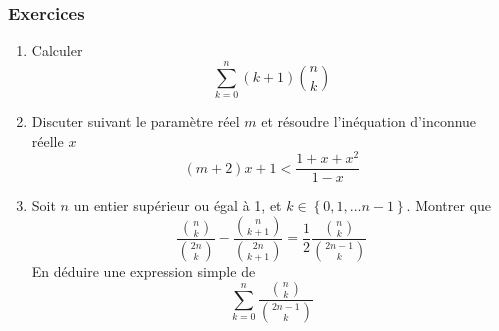 \subsubsection*{Exercices}
\begin{enumerate}
  \item Calculer
\begin{displaymath}
 \sum_{k=0}^n (k+1)\binom{n}{k}
\end{displaymath}

  \item Discuter suivant le param{\`e}tre réel $m$ et r{\'e}soudre l'in{\'e}quation d'inconnue réelle $x$
\begin{displaymath}
 (m+2)x+1<\frac{1+x+x^2}{1-x}
\end{displaymath}

  \item Soit $n$ un entier sup{\'e}rieur ou {\'e}gal {\`a} 1, et $k\in\left\lbrace0,1,\dots n-1 \right\rbrace$. Montrer que 
\begin{displaymath}
 \frac{\binom{n}{k}}{\binom{2n}{k}}-\frac{\binom{n}{k+1}}{\binom{2n}{k+1}}
=
\frac{1}{2}\frac{\binom{n}{k}}{\binom{2n-1}{k}}
\end{displaymath}
En d{\'e}duire une expression simple de
\begin{displaymath}
 \sum_{k=0}^n\frac{\binom{n}{k}}{\binom{2n-1}{k}}
\end{displaymath}
\end{enumerate}
